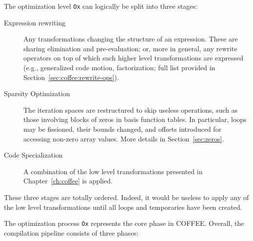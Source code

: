 The optimization level \texttt{Ox} can logically be split into three stages:
\begin{description}
\item[Expression rewriting] Any transformations changing the structure of an expression. These are sharing elimination and pre-evaluation; or, more in general, any rewrite operators on top of which such higher level transformations are expressed (e.g., generalized code motion, factorization; full list provided in Section~\ref{sec:coffee:rewrite-ops}). 
\item[Sparsity Optimization] The iteration spaces are restructured to skip useless operations, such as those involving blocks of zeros in basis function tables. In particular, loops may be fissioned, their bounds changed, and offsets introduced for accessing non-zero array values. More details in Section~\ref{sec:zeros}.
\item[Code Specialization] A combination of the low level transformations presented in Chapter~\ref{ch:coffee} is applied.
\end{description}
These three stages are totally ordered. Indeed, it would be useless to apply any of the low level transformations until all loops and temporaries have been created.

The optimization process \texttt{Ox} represents the core phase in COFFEE. Overall, the compilation pipeline consists of three phases:

